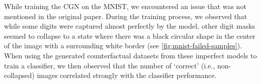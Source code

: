 While training the CGN on the MNIST, we encountered an issue that was not mentioned in the original paper. During the training process, we observed that while some digits were captured almost perfectly by the model, other digit masks seemed to collapse to a state where there was a black circular shape in the center of the image with a surrounding white border (see \cref{fig:mnist-failed-samples}). When using the generated counterfactual datasets from these imperfect models to train a classifier, we then observed that the number of `correct' (i.e., non-collapsed) images correlated strongly with the classifier performance.





